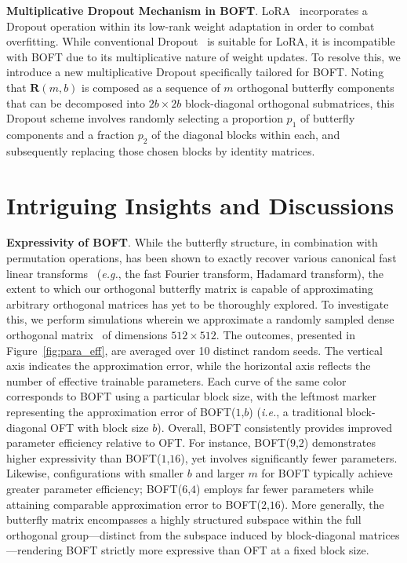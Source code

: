 \textbf{Multiplicative Dropout Mechanism in BOFT}. LoRA~\cite{hulora2022} incorporates a Dropout operation within its low-rank weight adaptation in order to combat overfitting. While conventional Dropout~\cite{srivastava2014dropout} is suitable for LoRA, it is incompatible with BOFT due to its multiplicative nature of weight updates. To resolve this, we introduce a new multiplicative Dropout specifically tailored for BOFT. Noting that $\bm{R}(m,b)$ is composed as a sequence of $m$ orthogonal butterfly components that can be decomposed into $2b\times 2b$ block-diagonal orthogonal submatrices, this Dropout scheme involves randomly selecting a proportion $p_1$ of butterfly components and a fraction $p_2$ of the diagonal blocks within each, and subsequently replacing those chosen blocks by identity matrices.

\section{Intriguing Insights and Discussions}

\textbf{Expressivity of BOFT}. While the butterfly structure, in combination with permutation operations, has been shown to exactly recover various canonical fast linear transforms~\cite{dao2019learning,dao2019kaleidoscope} (\emph{e.g.}, the fast Fourier transform, Hadamard transform), the extent to which our orthogonal butterfly matrix is capable of approximating arbitrary orthogonal matrices has yet to be thoroughly explored. To investigate this, we perform simulations wherein we approximate a randomly sampled dense orthogonal matrix~\cite{anderson1987generation} of dimensions $512\times 512$. The outcomes, presented in Figure~\ref{fig:para_eff}, are averaged over 10 distinct random seeds. The vertical axis indicates the approximation error, while the horizontal axis reflects the number of effective trainable parameters. Each curve of the same color corresponds to BOFT using a particular block size, with the leftmost marker representing the approximation error of BOFT($1$,$b$) (\emph{i.e.}, a traditional block-diagonal OFT with block size $b$). Overall, BOFT consistently provides improved parameter efficiency relative to OFT. For instance, BOFT($9$,$2$) demonstrates higher expressivity than BOFT($1$,$16$), yet involves significantly fewer parameters. Likewise, configurations with smaller $b$ and larger $m$ for BOFT typically achieve greater parameter efficiency; BOFT($6$,$4$) employs far fewer parameters while attaining comparable approximation error to BOFT($2$,$16$). More generally, the butterfly matrix encompasses a highly structured subspace within the full orthogonal group—distinct from the subspace induced by block-diagonal matrices—rendering BOFT strictly more expressive than OFT at a fixed block size.

